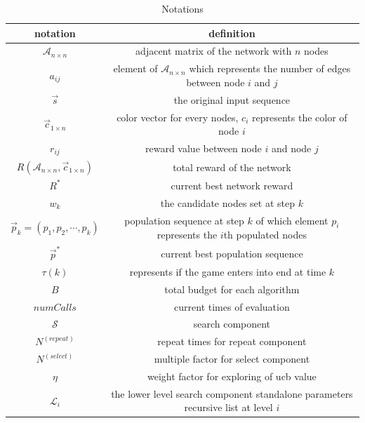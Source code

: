 \documentclass[compress]{beamer}
\begin{document}
\begin{frame}
\begin{table}[htbp]
  \tiny
  \centering
  \caption{Notations}
    \begin{tabular}{cc}
    \toprule
    notation &  definition \\
    \midrule
    {\color{red}$\mathcal{A}_{n \times n}$} & adjacent matrix of the network with $n$ nodes\\
    $a_{ij}$ & element of $\mathcal{A}_{n \times n}$ which represents the number of edges between node $i$ and $j$ \\
    $\vec s$ & the original input sequence \\
    {\color{red}$\vec c_{1 \times n}$} & color vector for every nodes, $c_{i}$ represents the color of node $i$\\
    {\color{red}$r_{ij}$} & reward value between node $i$ and node $j$\\
    {\color{red}$R(\mathcal{A}_{n \times n}, \vec c_{1 \times n})$} & total reward of the network \\
    $R^{*}$ & current best network reward \\
   {\color{red} $w_{k}$} & the candidate nodes set at step $k$\\
    {\color{red}$\vec p_{k} = (p_{1}, p_{2}, \cdots, p_{k})$} & population sequence at step $k$ of which element $p_{i}$ represents the $i$th populated nodes\\
    $\vec p^{*}$ & current best population sequence \\
    $\tau(k)$ & represents if the game enters into end at time $k$\\
    $B$ & total budget for each algorithm \\
    $numCalls$ & current times of evaluation \\
    $\mathcal{S}$ & search component \\
    $N^{(repeat)}$ & repeat times for repeat component \\
    {\color{red}$N^{(select)}$} & multiple factor for select component \\
    $\eta$ & weight factor for exploring of ucb value \\
    $\mathcal{L}_{i}$ & the lower level search component standalone parameters recursive list at level $i$\\
    \bottomrule
    \end{tabular}%
  \label{tab:notations}%
\end{table}%
\end{frame}
\end{document}
